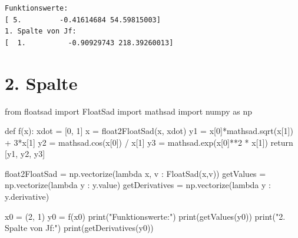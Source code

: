 \documentclass[
  a4paper,
  DIV=11]{scrreprt}
\newenvironment{Shaded}{\begin{snugshade}}{\end{snugshade}}
\newcommand{\BuiltInTok}[1]{\textcolor[rgb]{0.00,0.23,0.31}{#1}}
\newcommand{\ControlFlowTok}[1]{\textcolor[rgb]{0.00,0.23,0.31}{#1}}
\newcommand{\DecValTok}[1]{\textcolor[rgb]{0.68,0.00,0.00}{#1}}
\newcommand{\ImportTok}[1]{\textcolor[rgb]{0.00,0.46,0.62}{#1}}
\newcommand{\KeywordTok}[1]{\textcolor[rgb]{0.00,0.23,0.31}{#1}}
\newcommand{\NormalTok}[1]{\textcolor[rgb]{0.00,0.23,0.31}{#1}}
\newcommand{\OperatorTok}[1]{\textcolor[rgb]{0.37,0.37,0.37}{#1}}
\newcommand{\StringTok}[1]{\textcolor[rgb]{0.13,0.47,0.30}{#1}}
\theoremstyle{definition}
\theoremstyle{definition}
\theoremstyle{remark}
\begin{document}
\begin{verbatim}
Funktionswerte:
[ 5.         -0.41614684 54.59815003]
1. Spalte von Jf:
[  1.          -0.90929743 218.39260013]
\end{verbatim}

\section{2. Spalte}

\begin{Shaded}
\begin{Highlighting}[]
\ImportTok{from}\NormalTok{ floatsad }\ImportTok{import}\NormalTok{ FloatSad}
\ImportTok{import}\NormalTok{ mathsad}
\ImportTok{import}\NormalTok{ numpy }\ImportTok{as}\NormalTok{ np}

\KeywordTok{def}\NormalTok{ f(x):}
\NormalTok{    xdot }\OperatorTok{=}\NormalTok{ [}\DecValTok{0}\NormalTok{, }\DecValTok{1}\NormalTok{]}
\NormalTok{    x }\OperatorTok{=}\NormalTok{ float2FloatSad(x, xdot)}
\NormalTok{    y1 }\OperatorTok{=}\NormalTok{ x[}\DecValTok{0}\NormalTok{]}\OperatorTok{*}\NormalTok{mathsad.sqrt(x[}\DecValTok{1}\NormalTok{]) }\OperatorTok{+} \DecValTok{3}\OperatorTok{*}\NormalTok{x[}\DecValTok{1}\NormalTok{]}
\NormalTok{    y2 }\OperatorTok{=}\NormalTok{ mathsad.cos(x[}\DecValTok{0}\NormalTok{]) }\OperatorTok{/}\NormalTok{ x[}\DecValTok{1}\NormalTok{]}
\NormalTok{    y3 }\OperatorTok{=}\NormalTok{ mathsad.exp(x[}\DecValTok{0}\NormalTok{]}\OperatorTok{**}\DecValTok{2} \OperatorTok{*}\NormalTok{ x[}\DecValTok{1}\NormalTok{])}
    \ControlFlowTok{return}\NormalTok{ [y1, y2, y3]    }


\NormalTok{float2FloatSad }\OperatorTok{=}\NormalTok{ np.vectorize(}\KeywordTok{lambda}\NormalTok{ x, v : FloatSad(x,v))}
\NormalTok{getValues }\OperatorTok{=}\NormalTok{ np.vectorize(}\KeywordTok{lambda}\NormalTok{ y : y.value)}
\NormalTok{getDerivatives }\OperatorTok{=}\NormalTok{ np.vectorize(}\KeywordTok{lambda}\NormalTok{ y : y.derivative)}


\NormalTok{x0 }\OperatorTok{=}\NormalTok{ (}\DecValTok{2}\NormalTok{, }\DecValTok{1}\NormalTok{)}
\NormalTok{y0 }\OperatorTok{=}\NormalTok{ f(x0)}
\BuiltInTok{print}\NormalTok{(}\StringTok{"Funktionswerte:"}\NormalTok{)}
\BuiltInTok{print}\NormalTok{(getValues(y0))}
\BuiltInTok{print}\NormalTok{(}\StringTok{"2. Spalte von Jf:"}\NormalTok{)}
\BuiltInTok{print}\NormalTok{(getDerivatives(y0))}
\end{Highlighting}
\end{Shaded}
\end{document}
